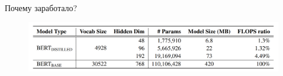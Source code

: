 \documentclass[notes,12pt, aspectratio=169]{beamer}
\begin{document}
\begin{frame}{Почему заработало?}
\begin{figure}
	\centering
	\includegraphics[width=0.9\linewidth]{images/power}
	\label{fig:seq2seq}
\end{figure}
\end{frame}
\end{document}
